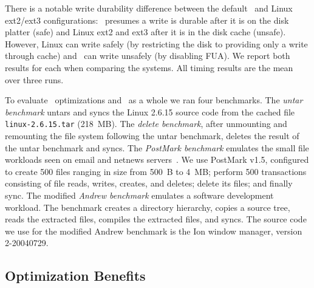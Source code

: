There is a notable write durability difference between the default
\Kudos\ and Linux ext2/ext3 configurations: \Kudos\ presumes a write
is durable after it is on the disk platter (safe) and Linux ext2 and
ext3 after it is in the disk cache (unsafe). However, Linux can write
safely (by restricting the disk to providing only a write through
cache) and \Kudos\ can write unsafely (by disabling FUA).
%
We report both results for each when comparing the systems.
%
All timing results are the mean over three runs.

To evaluate \patch\ optimizations and \Kudos\ as a whole we ran four
benchmarks.
%
The \emph{untar benchmark} untars and syncs the Linux 2.6.15 source code
from the cached file \texttt{linux-2.6.15.tar} (218~MB).
%
The \emph{delete benchmark}, after unmounting and remounting the file
system following the untar benchmark, deletes the result of the untar
benchmark and syncs.
%
The \emph{PostMark benchmark} emulates the small file workloads seen
on email and netnews servers~\cite{postmark}. We use PostMark v1.5,
configured to create 500 files ranging in size from 500~B to 4~MB;
perform 500 transactions consisting of file reads, writes, creates,
and deletes; delete its files; and finally sync.
%
The modified \emph{Andrew benchmark} emulates a software development
workload.  The benchmark creates a directory hierarchy, copies a
source tree, reads the extracted files, compiles the extracted files,
and syncs. The source code we use for the modified Andrew benchmark is
the Ion window manager, version 2-20040729.

\subsection {Optimization Benefits}

